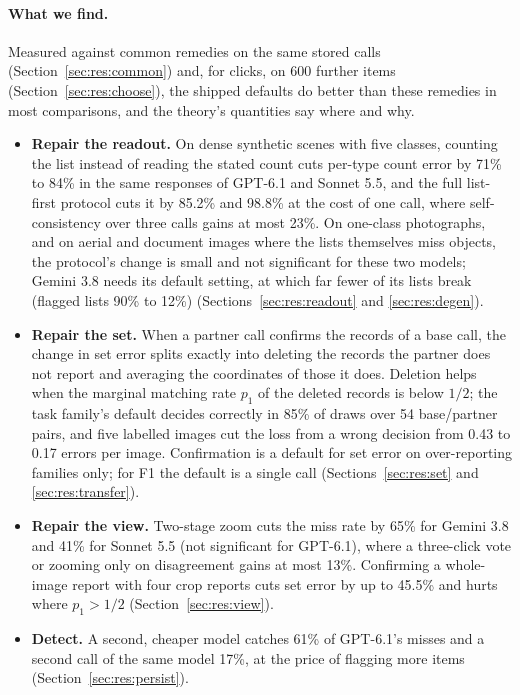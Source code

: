 \paragraph{What we find.} Measured against common remedies on the same stored calls (Section~\ref{sec:res:common}) and, for clicks, on 600 further items (Section~\ref{sec:res:choose}), the shipped defaults do better than these remedies in most comparisons, and the theory's quantities say where and why.
\begin{itemize}
\item \textbf{Repair the readout.} On dense synthetic scenes with five classes, counting the list instead of reading the stated count cuts per-type count error by 71\% to 84\% in the same responses of GPT-6.1 and Sonnet 5.5, and the full list-first protocol cuts it by 85.2\% and 98.8\% at the cost of one call, where self-consistency over three calls gains at most 23\%. On one-class photographs, and on aerial and document images where the lists themselves miss objects, the protocol's change is small and not significant for these two models; Gemini 3.8 needs its default setting, at which far fewer of its lists break (flagged lists 90\% to 12\%) (Sections~\ref{sec:res:readout} and \ref{sec:res:degen}).
\item \textbf{Repair the set.} When a partner call confirms the records of a base call, the change in set error splits exactly into deleting the records the partner does not report and averaging the coordinates of those it does. Deletion helps when the marginal matching rate $p_1$ of the deleted records is below $1/2$; the task family's default decides correctly in 85\% of draws over 54 base/partner pairs, and five labelled images cut the loss from a wrong decision from 0.43 to 0.17 errors per image. Confirmation is a default for set error on over-reporting families only; for F1 the default is a single call (Sections~\ref{sec:res:set} and \ref{sec:res:transfer}).
\item \textbf{Repair the view.} Two-stage zoom cuts the miss rate by 65\% for Gemini 3.8 and 41\% for Sonnet 5.5 (not significant for GPT-6.1), where a three-click vote or zooming only on disagreement gains at most 13\%. Confirming a whole-image report with four crop reports cuts set error by up to 45.5\% and hurts where $p_1>1/2$ (Section~\ref{sec:res:view}).
\item \textbf{Detect.} A second, cheaper model catches 61\% of GPT-6.1's misses and a second call of the same model 17\%, at the price of flagging more items (Section~\ref{sec:res:persist}).

\end{itemize}

